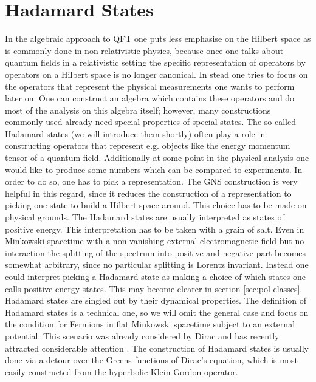 \documentclass[a4paper,11pt]{article}
\begin{document}
\section{Hadamard States}
In the algebraic approach to QFT one puts less emphasise on the Hilbert space as is commonly done in non relativistic physics, because 
once one talks about quantum fields in a relativistic setting the specific representation of operators by operators on a Hilbert 
space is no longer canonical. 
In stead one tries to focus on the operators that represent the physical measurements one wants to perform later on. 
One can construct an algebra which contains these operators and do most of the analysis on this algebra itself; however, 
many constructions commonly used already need special properties of special states. The so called Hadamard states 
(we will introduce them shortly) often play a role in constructing operators that represent e.g. objects like the energy 
momentum tensor of a quantum field. Additionally at some point in
the physical analysis one would like to produce some numbers which can be compared to experiments. In order to do so, one
has to pick a representation. The GNS construction is very helpful in this regard, since it reduces the construction of a representation to 
picking one state to build a Hilbert space around. This choice has to be made on physical grounds. 
The Hadamard states are usually interpreted as states of positive energy. This interpretation has to be taken with 
a grain of salt. Even in Minkowski spacetime with a non vanishing external electromagnetic field but no interaction the splitting of the
spectrum into positive and negative part becomes somewhat arbitrary, since no particular splitting is Lorentz invariant\cite{something!}.
Instead one could interpret picking a Hadamard state as making a choice of which states one
calls positive energy states. This may become clearer in section \ref{sec:pol classes}. 
Hadamard states are singled out by their dynamical properties. The definition of Hadamard states is a technical one, so we will omit
the general case and focus on the condition for Fermions in flat Minkowski spacetime subject to an external potential. This scenario was
already considered by Dirac \cite{Dirac34} and has recently attracted considerable attention \cite{zahn, shlemmerZahn}.  
The construction of Hadamard states is usually done via a detour over the Greens functions of Dirac's equation, which is most easily 
constructed from the hyperbolic Klein-Gordon operator.
\end{document}

